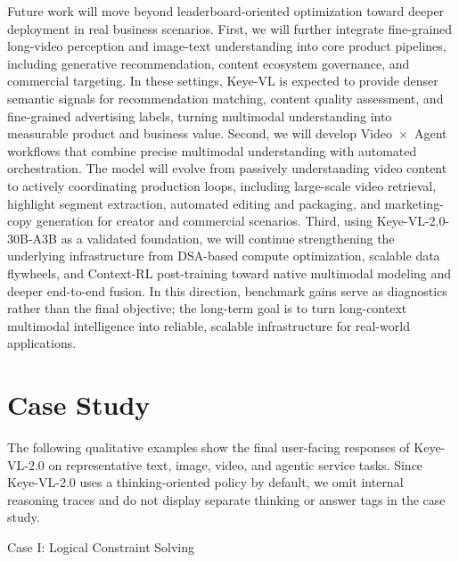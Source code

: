 \documentclass{llmxive}
\providecommand{\subsubsubsection}{\vskip
5pt{\noindent\normalsize\rm\raggedright}}
\begin{document}
Future work will move beyond leaderboard-oriented optimization toward deeper deployment in real business scenarios. First, we will further integrate fine-grained long-video perception and image-text understanding into core product pipelines, including generative recommendation, content ecosystem governance, and commercial targeting. In these settings, Keye-VL is expected to provide denser semantic signals for recommendation matching, content quality assessment, and fine-grained advertising labels, turning multimodal understanding into measurable product and business value. Second, we will develop Video~$\times$~Agent workflows that combine precise multimodal understanding with automated orchestration. The model will evolve from passively understanding video content to actively coordinating production loops, including large-scale video retrieval, highlight segment extraction, automated editing and packaging, and marketing-copy generation for creator and commercial scenarios. Third, using Keye-VL-2.0-30B-A3B as a validated foundation, we will continue strengthening the underlying infrastructure from DSA-based compute optimization, scalable data flywheels, and Context-RL post-training toward native multimodal modeling and deeper end-to-end fusion. In this direction, benchmark gains serve as diagnostics rather than the final objective; the long-term goal is to turn long-context multimodal intelligence into reliable, scalable infrastructure for real-world applications.








\appendix


\section{Case Study}

The following qualitative examples show the final user-facing responses of Keye-VL-2.0 on representative text, image, video, and agentic service tasks. Since Keye-VL-2.0 uses a thinking-oriented policy by default, we omit internal reasoning traces and do not display separate thinking or answer tags in the case study.

\subsubsubsection{Case I: Logical Constraint Solving}
\label{text_cases}
\end{document}
